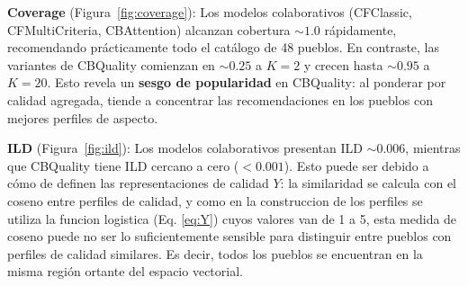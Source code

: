 \documentclass[11pt, a4paper]{article}
\begin{document}
\textbf{Coverage} (Figura~\ref{fig:coverage}): Los modelos colaborativos (CFClassic, CFMultiCriteria, CBAttention) alcanzan cobertura $\sim 1.0$ rápidamente, recomendando prácticamente todo el catálogo de 48 pueblos. En contraste, las variantes de CBQuality comienzan en $\sim 0.25$ a $K=2$ y crecen hasta $\sim 0.95$ a $K=20$. Esto revela un \textbf{sesgo de popularidad} en CBQuality: al ponderar por calidad agregada, tiende a concentrar las recomendaciones en los pueblos con mejores perfiles de aspecto.

\textbf{ILD} (Figura~\ref{fig:ild}): Los modelos colaborativos presentan ILD $\sim 0.006$, mientras que CBQuality tiene ILD cercano a cero ($< 0.001$). Esto puede ser debido a cómo de definen las representaciones de calidad $Y$: la similaridad se calcula con el coseno entre perfiles de calidad, y como en la construccion de los perfiles se utiliza la funcion logistica (Eq. \ref{eq:Y}) cuyos valores van de 1 a 5, esta medida de coseno puede no ser lo suficientemente sensible para distinguir entre pueblos con perfiles de calidad similares. Es decir, todos los pueblos se encuentran en la misma región ortante del espacio vectorial.




\end{document}
